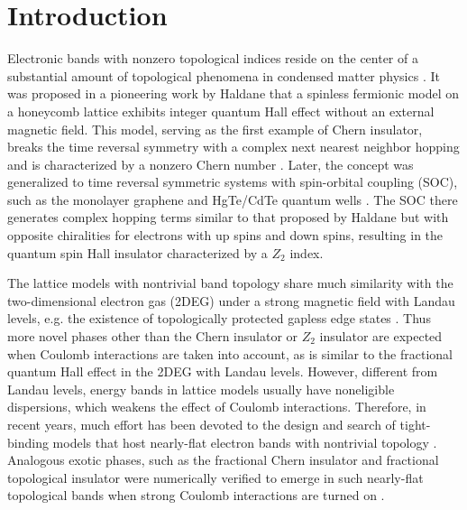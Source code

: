 \documentclass[amsmath,superscriptaddress,showpacs,aps,prb,twocolumn]{revtex4-1}
\begin{document}
\section{Introduction}
\par Electronic bands with nonzero topological indices reside on the center of a substantial amount of topological phenomena in condensed matter physics \cite{HK_RMP2010,QZ_RMP2011}. It was proposed in a pioneering work by Haldane \cite{H_PRL1988} that a spinless fermionic model on a honeycomb lattice exhibits integer quantum Hall effect \cite{KDP_PRL1980} without an external magnetic field. This model, serving as the first example of Chern insulator, breaks the time reversal symmetry with a complex next nearest neighbor hopping and is characterized by a nonzero Chern number \cite{TKNN_PRL1982}. Later, the concept was generalized to time reversal symmetric systems with spin-orbital coupling (SOC), such as the monolayer graphene \cite{KM_PRL2005a,KM_PRL2005b} and HgTe/CdTe quantum wells \cite{BHZ_S2006,Ketc_S2007}. The SOC there generates complex hopping terms similar to that proposed by Haldane but with opposite chiralities for electrons with up spins and down spins, resulting in the quantum spin Hall insulator characterized by a $Z_2$ index.

\par The lattice models with nontrivial band topology share much similarity with the two-dimensional electron gas (2DEG) under a strong magnetic field with Landau levels, e.g. the existence of topologically protected gapless edge states \cite{H_PRL1988,L_PRB1981,H_PRB1982,KM_PRL2005a,KM_PRL2005b,BHZ_S2006,Ketc_S2007}. Thus more novel phases other than the Chern insulator or $Z_2$ insulator are expected when Coulomb interactions are taken into account, as is similar to the fractional quantum Hall effect \cite{TSG_PRL1982,L_PRL1983} in the 2DEG with Landau levels. However, different from Landau levels, energy bands in lattice models usually have noneligible dispersions, which weakens the effect of Coulomb interactions. Therefore, in recent years, much effort has been devoted to the design and search of tight-binding models that host nearly-flat electron bands with nontrivial topology \cite{TMW_PRL2011,WR_PRB2011,SGKD_PRL2011,WGGS_PRL2011,NSCM_PRL2011,TB_PRB2012,YGSD_PRB2012}. Analogous exotic phases, such as the fractional Chern insulator and fractional topological insulator were numerically verified to emerge in such nearly-flat topological bands when strong Coulomb interactions are turned on \cite{NSCM_PRL2011,SGSS_NC2011,RB_PRX2011,NSRCM_PRB2011,LBFL_PRL2012}.
\end{document}
